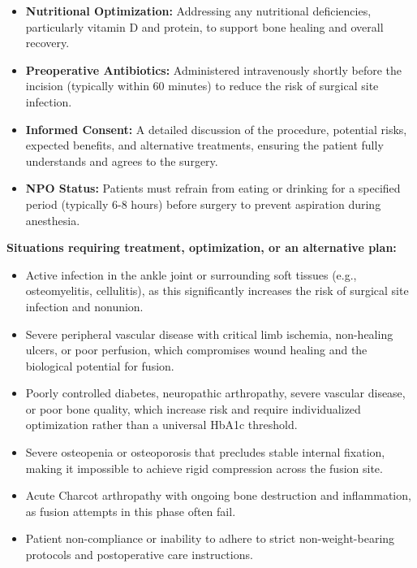 \begin{itemize}
  \item \textbf{Nutritional Optimization:} Addressing any nutritional deficiencies, particularly vitamin D and protein, to support bone healing and overall recovery.
  
  \item \textbf{Preoperative Antibiotics:} Administered intravenously shortly before the incision (typically within 60 minutes) to reduce the risk of surgical site infection.
  
  \item \textbf{Informed Consent:} A detailed discussion of the procedure, potential risks, expected benefits, and alternative treatments, ensuring the patient fully understands and agrees to the surgery.
  
  \item \textbf{NPO Status:} Patients must refrain from eating or drinking for a specified period (typically 6-8 hours) before surgery to prevent aspiration during anesthesia.
\end{itemize}

\textbf{Situations requiring treatment, optimization, or an alternative plan:}
\begin{itemize}
  \item Active infection in the ankle joint or surrounding soft tissues (e.g., osteomyelitis, cellulitis), as this significantly increases the risk of surgical site infection and nonunion.
  
  \item Severe peripheral vascular disease with critical limb ischemia, non-healing ulcers, or poor perfusion, which compromises wound healing and the biological potential for fusion.
  
  \item Poorly controlled diabetes, neuropathic arthropathy, severe vascular disease, or poor bone quality, which increase risk and require individualized optimization rather than a universal HbA1c threshold.
  
  \item Severe osteopenia or osteoporosis that precludes stable internal fixation, making it impossible to achieve rigid compression across the fusion site.
  
  \item Acute Charcot arthropathy with ongoing bone destruction and inflammation, as fusion attempts in this phase often fail.
  
  \item Patient non-compliance or inability to adhere to strict non-weight-bearing protocols and postoperative care instructions.
\end{itemize}

